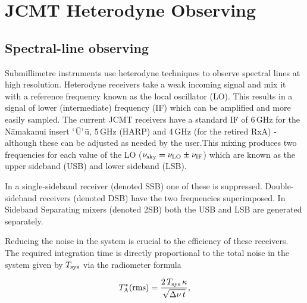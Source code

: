 \documentclass[11pt,oneside,chapters]{starlink}
\begin{document}
\clearpage
\chapter{JCMT Heterodyne Observing}
\label{sec:het}

\section{Spectral-line observing}

Submillimetre instruments use heterodyne techniques to observe
spectral lines at high resolution. Heterodyne receivers take a weak
incoming signal and mix it with a reference frequency known as the
local oscillator (LO). This results in a signal of lower
(intermediate) frequency (IF) which can be amplified and more easily
sampled. The current JCMT receivers have a standard IF of 6\,GHz for
the  N\=amakanui insert $`$\=U$`$\=u, 5\,GHz (HARP) and 4\,GHz
(for the retired RxA) - although these can be adjusted as needed by
the user.This mixing produces two frequencies for each value of
the LO ($\nu_{\textnormal{sky}} = \nu_{\textnormal{LO}}\pm\nu_{\textnormal{IF}}$) which are known as the
upper sideband (USB) and lower sideband (LSB).

In a single-sideband receiver (denoted SSB) one of these is suppressed.
Double-sideband receivers (denoted DSB) have the two frequencies
superimposed. In Sideband Separating mixers (denoted 2SB) both the
USB and LSB are generated separately.

Reducing the noise in the system is crucial to the efficiency of these
receivers. The required integration time is directly proportional to
the total noise in the system given by $T_{\textnormal{sys}}$ via the radiometer
formula

\[T_{\textnormal{A}}^*({\textnormal{rms}}) =
\frac{2\,T_{\textnormal{sys}}\,\kappa}{\sqrt{\Delta\nu\,t}},\]
\end{document}
